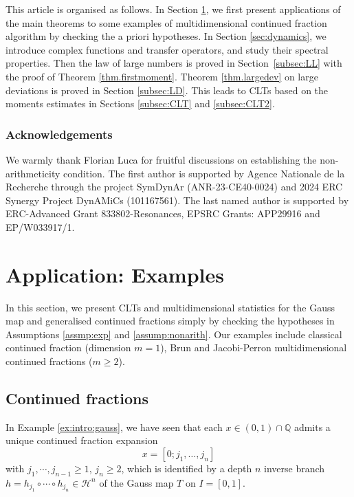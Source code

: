 \documentclass[12pt,a4paper,reqno]{amsart}
\begin{document}
This article is organised as follows. In Section \ref{sec:examples}, we first present applications of the main theorems to some examples of multidimensional continued fraction algorithm by checking the a priori hypotheses. In Section \ref{sec:dynamics}, we introduce complex functions and transfer operators, and study their spectral properties. 
Then the law of large  numbers is proved in Section~\ref{subsec:LL} with the proof of Theorem \ref{thm.firstmoment}. 
Theorem \ref{thm.largedev}  on large deviations is proved in Section \ref{subsec:LD}. This leads to CLTs based on the moments estimates in Sections \ref{subsec:CLT}
and \ref{subsec:CLT2}. 



\subsubsection*{Acknowledgements}
We  warmly thank Florian Luca for fruitful discussions  on establishing the  non-arithmeticity condition. The first author is supported by Agence Nationale de la Recherche through the project SymDynAr (ANR-23-CE40-0024) and 2024 ERC Synergy Project DynAMiCs (101167561). The last named author is supported by ERC-Advanced Grant 833802-Resonances, EPSRC Grants: APP29916 and EP/W033917/1. 



\section{Application: Examples} \label{sec:examples}


In this section, we present CLTs and multidimensional statistics for the Gauss map and generalised continued fractions simply by checking the hypotheses in Assumptions  \ref{assmp:exp} and \ref{assump:nonarith}.
Our examples include classical continued fraction (dimension $m=1$),  Brun and Jacobi-Perron  multidimensional continued fractions ($m \geq 2$). %





\subsection{Continued fractions}\label{subsec:cfGauss}

In Example \ref{ex:intro:gauss}, we have seen that each $x \in (0,1) \cap \mathbb Q$ admits a unique continued fraction expansion 
\[ x=[0; j_1, \ldots ,j_n] \]
with $j_1, \cdots, j_{n-1} \geq 1$, $j_n \geq 2$, which is identified by a depth $n$ inverse branch $h=h_{j_1} \circ \cdots \circ h_{j_n} \in \mathcal{H}^n$ of the Gauss map $T$ on $I=[0,1]$. 
\end{document}
